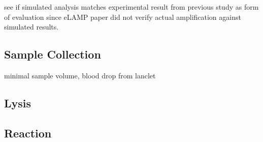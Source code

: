 \documentclass{article}
\begin{document}
see if simulated analysis matches experimental result from previous study as form of evaluation since eLAMP paper did not verify actual amplification against simulated results.

\subsection{Sample Collection}

minimal sample volume, blood drop from lanclet 

\subsection{Lysis}

\cite{curtis2008rapid}

\subsection{Reaction}





\end{document}
